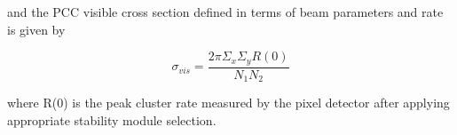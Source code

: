 and the PCC visible cross section defined in terms of beam parameters and rate is given by 

\begin{equation}
\sigma_{vis} = \frac{2 \pi \Sigma_x \Sigma_y R(0)}{N_1 N_2} 
\end{equation}

where R(0) is the peak cluster rate measured by the pixel detector after applying appropriate stability module selection.




